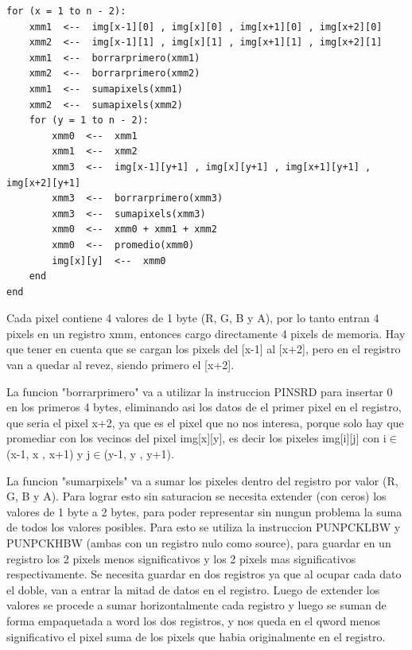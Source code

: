 \documentclass[a4paper]{article}
\begin{document}
\begin{lstlisting}
for (x = 1 to n - 2):
	xmm1  <--  img[x-1][0] , img[x][0] , img[x+1][0] , img[x+2][0]
	xmm2  <--  img[x-1][1] , img[x][1] , img[x+1][1] , img[x+2][1]
	xmm1  <--  borrarprimero(xmm1)
	xmm2  <--  borrarprimero(xmm2)
	xmm1  <--  sumapixels(xmm1)
	xmm2  <--  sumapixels(xmm2)
	for (y = 1 to n - 2): 
		xmm0  <--  xmm1
		xmm1  <--  xmm2
		xmm3  <--  img[x-1][y+1] , img[x][y+1] , img[x+1][y+1] , img[x+2][y+1]
		xmm3  <--  borrarprimero(xmm3)
		xmm3  <--  sumapixels(xmm3)
		xmm0  <--  xmm0 + xmm1 + xmm2
		xmm0  <--  promedio(xmm0)
		img[x][y]  <--  xmm0
	end
end
\end{lstlisting}

Cada pixel contiene 4 valores de 1 byte (R, G, B y A), por lo tanto entran 4 pixels en un registro xmm, entonces cargo directamente 4 pixels de memoria. Hay que tener en cuenta que se cargan los pixels del [x-1] al [x+2], pero en el registro van a quedar al revez, siendo primero el [x+2].
\newline

La funcion "borrarprimero" va a utilizar la instruccion PINSRD para insertar 0 en los primeros 4 bytes, eliminando asi los datos de el primer pixel en el registro, que seria el pixel x+2, ya que es el pixel que no nos interesa, porque solo hay que promediar con los vecinos del pixel img[x][y], es decir los pixeles img[i][j] con i$\in$(x-1, x , x+1) y j$\in$(y-1, y , y+1).
\newline

La funcion "sumarpixels" va a sumar los pixeles dentro del registro por valor (R, G, B y A). Para lograr esto sin saturacion se necesita extender (con ceros) los valores de 1 byte a 2 bytes, para poder representar sin nungun problema la suma de todos los valores posibles. Para esto se utiliza la instruccion PUNPCKLBW y PUNPCKHBW (ambas con un registro nulo como source), para guardar en un registro los 2 pixels menos significativos y los 2 pixels mas significativos respectivamente. Se necesita guardar en dos registros ya que al ocupar cada dato el doble, van a entrar la mitad de datos en el registro. Luego de extender los valores se procede a sumar horizontalmente cada registro y luego se suman de forma empaquetada a word los dos registros, y nos queda en el qword menos significativo el pixel suma de los pixels que habia originalmente en el registro.
\newline
\end{document}
